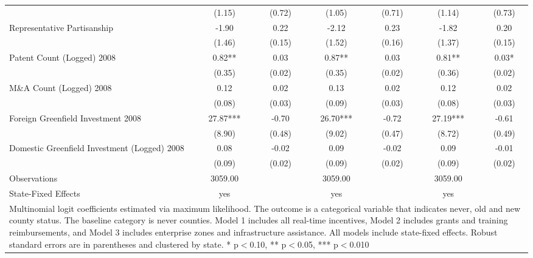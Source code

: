 \begin{table}[!htbp]
\begin{tabular}{l*{6}{c}}
                    &      (1.15)   &      (0.72)   &      (1.05)   &      (0.71)   &      (1.14)   &      (0.73)   \\
Representative Partisanship&       -1.90   &        0.22   &       -2.12   &        0.23   &       -1.82   &        0.20   \\
                    &      (1.46)   &      (0.15)   &      (1.52)   &      (0.16)   &      (1.37)   &      (0.15)   \\
Patent Count (Logged) 2008&        0.82** &        0.03   &        0.87** &        0.03   &        0.81** &        0.03*  \\
                    &      (0.35)   &      (0.02)   &      (0.35)   &      (0.02)   &      (0.36)   &      (0.02)   \\
M\&A Count (Logged) 2008&        0.12   &        0.02   &        0.13   &        0.02   &        0.12   &        0.02   \\
                    &      (0.08)   &      (0.03)   &      (0.09)   &      (0.03)   &      (0.08)   &      (0.03)   \\
Foreign Greenfield Investment 2008&       27.87***&       -0.70   &       26.70***&       -0.72   &       27.19***&       -0.61   \\
                    &      (8.90)   &      (0.48)   &      (9.02)   &      (0.47)   &      (8.72)   &      (0.49)   \\
Domestic Greenfield Investment (Logged) 2008&        0.08   &       -0.02   &        0.09   &       -0.02   &        0.09   &       -0.01   \\
                    &      (0.09)   &      (0.02)   &      (0.09)   &      (0.02)   &      (0.09)   &      (0.02)   \\
\hline
Observations        &     3059.00   &               &     3059.00   &               &     3059.00   &               \\
State-Fixed Effects &         yes   &               &         yes   &               &         yes   &               \\
\hline\hline
\multicolumn{7}{p{\linewidth}}{\footnotesize Multinomial logit coefficients estimated via maximum likelihood. The outcome is a categorical variable that indicates  never, old and new county status. The baseline category is never counties. Model 1 includes all real-time incentives, Model 2 includes grants and training reimbursements, and Model 3 includes enterprise zones and infrastructure assistance. All models include state-fixed effects. Robust standard errors are in parentheses and clustered by state. * p$<$0.10, ** p$<$0.05, *** p$<$0.010}\\
\end{tabular}
\end{table}
